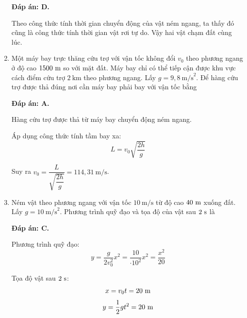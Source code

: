 \begin{enumerate}[label=\bfseries Câu \arabic*:]
	\hideall
	{	\textbf{Đáp án: D.}	
		
		Theo công thức tính thời gian chuyển động của vật ném ngang, ta thấy đó cũng là công thức tính thời gian vật rơi tự do. Vậy hai vật chạm đất cùng lúc.
	}
	
	
	
	\item {}
	
	
	{Một máy bay trực thăng cứu trợ với vận tốc không đổi $v_0$ theo phương ngang ở độ cao $1500\ \text m$ so với mặt đất. Máy bay chỉ có thể tiếp cận được khu vực cách điểm cứu trợ $2\ \text{km}$ theo phương ngang. Lấy $g=9,8\ \text {m/s}^2$. Để hàng cứu trợ được thả đúng nơi cần máy bay phải bay với vận tốc bằng
	}
	
	\hideall
	{	\textbf{Đáp án: A.}
		
		Hàng cứu trợ được thả từ máy bay chuyển động ném ngang.
		
		Áp dụng công thức tính tầm bay xa:
		\[L=v_0\sqrt{\dfrac{2h}{g}}\]
		
		Suy ra $v_0 = \dfrac{L}{\sqrt{\dfrac{2h}{g}}}=114,31\ \text{m/s}$.
	}
	
	\item {}
	
	
	{Ném vật theo phương ngang với vận tốc $10\ \text{m/s}$ từ độ cao $40\ \text m$ xuống đất. Lấy $g=10\ \text{m/s}^2$. Phương trình quỹ đạo và tọa độ của vật sau $2\ \text s$ là
	}
	
	\hideall
	{	\textbf{Đáp án: C.}
		
		Phương trình quỹ đạo:
		\[y=\dfrac{g}{2v_0^2}x^2 = \dfrac{10}{\cdot 10^2}x^2 = \dfrac{x^2}{20}\]
		
		Tọa độ vật sau $2\ \text s$:
		\[x=v_0 t = 20\ \text m\]
		\[y=\dfrac{1}{2}gt^2 = 20\ \text m\]
	}
	
	
\end{enumerate}



